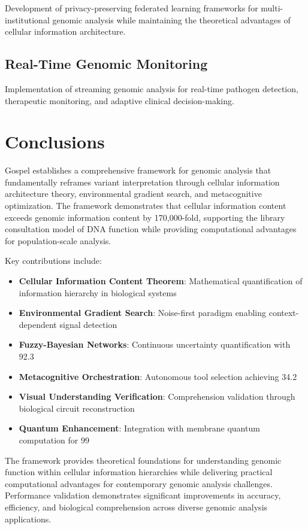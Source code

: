 \documentclass[12pt,a4paper]{article}
\begin{document}
Development of privacy-preserving federated learning frameworks for multi-institutional genomic analysis while maintaining the theoretical advantages of cellular information architecture.

\subsection{Real-Time Genomic Monitoring}

Implementation of streaming genomic analysis for real-time pathogen detection, therapeutic monitoring, and adaptive clinical decision-making.

\section{Conclusions}

Gospel establishes a comprehensive framework for genomic analysis that fundamentally reframes variant interpretation through cellular information architecture theory, environmental gradient search, and metacognitive optimization. The framework demonstrates that cellular information content exceeds genomic information content by 170,000-fold, supporting the library consultation model of DNA function while providing computational advantages for population-scale analysis.

Key contributions include:

\begin{itemize}
\item \textbf{Cellular Information Content Theorem}: Mathematical quantification of information hierarchy in biological systems
\item \textbf{Environmental Gradient Search}: Noise-first paradigm enabling context-dependent signal detection  
\item \textbf{Fuzzy-Bayesian Networks}: Continuous uncertainty quantification with 92.3%
\item \textbf{Metacognitive Orchestration}: Autonomous tool selection achieving 34.2%
\item \textbf{Visual Understanding Verification}: Comprehension validation through biological circuit reconstruction
\item \textbf{Quantum Enhancement}: Integration with membrane quantum computation for 99%
\end{itemize}

The framework provides theoretical foundations for understanding genomic function within cellular information hierarchies while delivering practical computational advantages for contemporary genomic analysis challenges. Performance validation demonstrates significant improvements in accuracy, efficiency, and biological comprehension across diverse genomic analysis applications.
\end{document}
